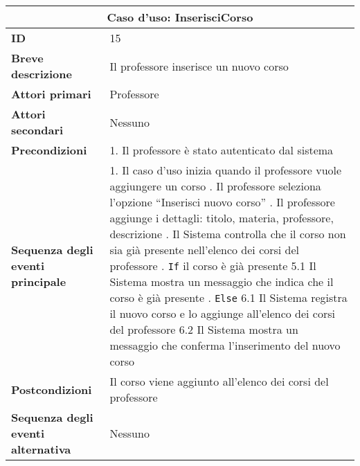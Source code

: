 \documentclass[11pt,a4paper]{report}
\begin{document}
\begin{table}[h!]
\centering
\renewcommand{\arraystretch}{1.3}
\begin{tabular}{|p{4.2cm}|p{10.2cm}|}
\hline
\multicolumn{2}{|c|}{\textbf{Caso d’uso: InserisciCorso}} \\ \hline
\textbf{ID} & 15 \\ \hline
\textbf{Breve descrizione} & Il professore inserisce un nuovo corso \\ \hline
\textbf{Attori primari} & Professore \\ \hline
\textbf{Attori secondari} & Nessuno \\ \hline
\textbf{Precondizioni} &
1. Il professore è stato autenticato dal sistema \\ \hline
\textbf{Sequenza degli eventi principale} &
1. Il caso d’uso inizia quando il professore vuole aggiungere un corso \newline
2. Il professore seleziona l’opzione “Inserisci nuovo corso” \newline
3. Il professore aggiunge i dettagli: titolo, materia, professore, descrizione \newline
4. Il Sistema controlla che il corso non sia già presente nell’elenco dei corsi del professore \newline
5. \texttt{If} il corso è già presente \newline
\hspace*{0.5cm} 5.1 Il Sistema mostra un messaggio che indica che il corso è già presente \newline
6. \texttt{Else} \newline
\hspace*{0.5cm} 6.1 Il Sistema registra il nuovo corso e lo aggiunge all’elenco dei corsi del professore \newline
\hspace*{0.5cm} 6.2 Il Sistema mostra un messaggio che conferma l’inserimento del nuovo corso \\ \hline
\textbf{Postcondizioni} & Il corso viene aggiunto all’elenco dei corsi del professore \\ \hline
\textbf{Sequenza degli eventi alternativa} & Nessuno \\ \hline
\end{tabular}
\end{table}

\end{document}

